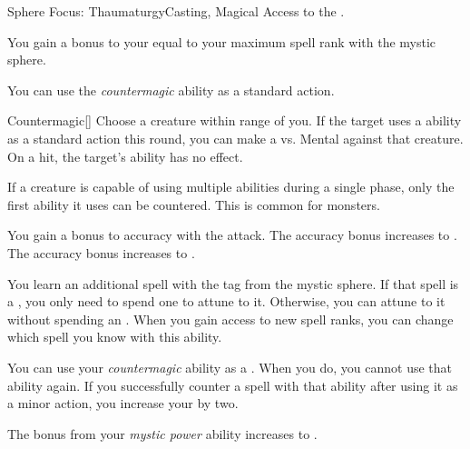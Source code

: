     \begin{feat}{Sphere Focus: Thaumaturgy}{Casting, Magical}
        \featpre Access to the  .

         You gain a bonus to your  equal to your maximum spell rank with the  mystic sphere.

         You can use the \textit{countermagic} ability as a standard action.
        \begin{activeability}{Countermagic}[]
            \rankline
            Choose a creature within \rngmed range of you.
            If the target uses a  ability as a standard action this round, you can make a  vs. Mental against that creature.
            On a hit, the target's ability has no effect.

            If a creature is capable of using multiple abilities during a single phase, only the first ability it uses can be countered.
            This is common for  monsters.

            \rankline
             You gain a  bonus to accuracy with the attack.
             The accuracy bonus increases to .
             The accuracy bonus increases to .
        \end{activeability}

         You learn an additional spell with the  tag from the  mystic sphere.
        If that spell is a , you only need to spend one  to attune to it.
        Otherwise, you can attune to it without spending an .
        When you gain access to new spell ranks, you can change which spell you know with this ability.

         You can use your \textit{countermagic} ability as a .
        When you do, you  cannot use that ability again.
        If you successfully counter a spell with that ability after using it as a minor action, you increase your  by two.

         The bonus from your \textit{mystic power} ability increases to .
    \end{feat}

